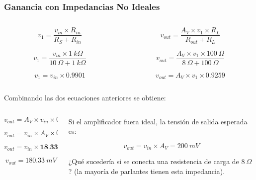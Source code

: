 \begin{frame}[t]
    \frametitle{Ganancia con Impedancias No Ideales}

    \begin{columns}
        \begin{column}{0.5\textwidth}
            \[ v_1 = \dfrac{v_{in} \times R_{in}}{R_{S} + R_{in}} \]

            \[ v_1 = \dfrac{v_{in} \times 1\ k\Omega}{10\ \Omega + 1\ k\Omega} \]

            \[ v_1 = v_{in} \times 0.9901 \]
        \end{column}
        \begin{column}{0.5\textwidth}
            \[ v_{out} = \dfrac{A_V \times v_{1} \times R_{L}}{R_{out} + R_{L}} \]

            \[ v_{out} = \dfrac{A_V \times v_{1} \times 100\ \Omega}{8\ \Omega + 100\ \Omega} \]

            \[ v_{out} = A_V \times v_{1} \times 0.9259 \]
        \end{column}
    \end{columns}

    \vspace{5mm}
    Combinando las dos ecuaciones anteriores se obtiene:

    \begin{columns}
        \begin{column}{0.5\textwidth}
            \[ v_{out} = A_V \times v_{in} \times 0.9901 \times 0.9259 \]

            \[ v_{out} = v_{in} \times A_V \times 0.9167 \]

            \[ v_{out} = v_{in} \times \textbf{18.3352} \]

            \[ \boxed{v_{out} = 180.33\ mV} \]
        \end{column}
        \begin{column}{0.5\textwidth}
            Si el amplificador fuera ideal, la tensión de salida esperada es: 
            
            \[ v_{out} = v_{in} \times A_V = 200\ mV \]
            
            \vspace{3mm}
            ¿Qué sucedería si se conecta una resistencia de carga de $8\ \Omega$? (la mayoría de parlantes tienen esta impedancia).
        \end{column}
    \end{columns}

\end{frame}

